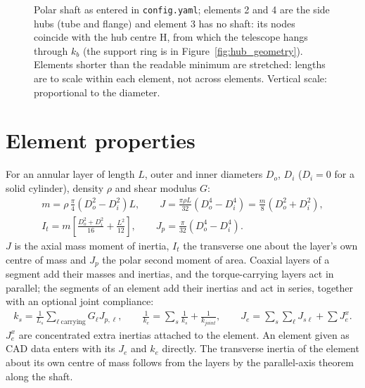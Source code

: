 \documentclass[10pt,a4paper]{article}
\numberwithin{equation}{section}
\begin{document}
\begin{figure}[H]
{}
\caption{Polar shaft as entered in \texttt{config.yaml}; elements 2 and 4 are the side hubs (tube and flange) and element 3 has no shaft: its nodes coincide with the hub centre H, from which the telescope hangs through $k_b$ (the support ring is in Figure~\ref{fig:hub_geometry}). Elements shorter than the readable minimum are stretched: lengths are to scale within each element, not across elements. Vertical scale: proportional to the diameter.}
\label{fig:geom_polare}\end{figure}
\section{Element properties}\label{sec:elements}
For an annular layer of length $L$, outer and inner diameters $D_o$, $D_i$ ($D_i = 0$ for a solid cylinder), density $\rho$ and shear modulus $G$:
\begin{gather}
m = \rho\,\frac{\pi}{4}\left(D_o^2 - D_i^2\right)L, \qquad
J = \frac{\pi\rho L}{32}\left(D_o^4 - D_i^4\right) = \frac{m}{8}\left(D_o^2 + D_i^2\right), \\
I_t = m\left[\frac{D_o^2 + D_i^2}{16} + \frac{L^2}{12}\right], \qquad
J_p = \frac{\pi}{32}\left(D_o^4 - D_i^4\right).
\end{gather}
$J$ is the axial mass moment of inertia, $I_t$ the transverse one about the layer's own centre of mass and $J_p$ the polar second moment of area. Coaxial layers of a segment add their masses and inertias, and the torque-carrying layers act in parallel; the segments of an element add their inertias and act in series, together with an optional joint compliance:
\begin{gather}
k_s = \frac{1}{L_s}\sum_{\ell\ \text{carrying}} G_\ell J_{p,\ell}, \qquad
\frac{1}{k_e} = \sum_s \frac{1}{k_s} + \frac{1}{k_{joint}}, \qquad
J_e = \sum_s\sum_\ell J_{s\ell} + \sum J^{x}_e.
\end{gather}
$J^{x}_e$ are concentrated extra inertias attached to the element. An element given as CAD data enters with its $J_e$ and $k_e$ directly. The transverse inertia of the element about its own centre of mass follows from the layers by the parallel-axis theorem along the shaft.
\begingroup\footnotesize\setlength{\tabcolsep}{3.2pt}
\end{document}
